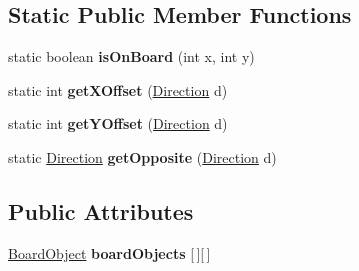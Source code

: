 \subsection*{Static Public Member Functions}
\begin{DoxyCompactItemize}
\item 
\mbox{\label{classasciicrawler_1_1Board_abf113bdc50898a0f64eb3611b98111ea}} 
static boolean {\bfseries is\+On\+Board} (int x, int y)
\item 
\mbox{\label{classasciicrawler_1_1Board_a3ec369e192af66b0aa62f0a5ed5f18b0}} 
static int {\bfseries get\+X\+Offset} (\hyperlink{enumasciicrawler_1_1Direction}{Direction} d)
\item 
\mbox{\label{classasciicrawler_1_1Board_a8de1ca8752186e89183ec33c24316c41}} 
static int {\bfseries get\+Y\+Offset} (\hyperlink{enumasciicrawler_1_1Direction}{Direction} d)
\item 
\mbox{\label{classasciicrawler_1_1Board_a115e44d78ee7c3edbd83dba743433634}} 
static \hyperlink{enumasciicrawler_1_1Direction}{Direction} {\bfseries get\+Opposite} (\hyperlink{enumasciicrawler_1_1Direction}{Direction} d)
\end{DoxyCompactItemize}
\subsection*{Public Attributes}
\begin{DoxyCompactItemize}
\item 
\mbox{\label{classasciicrawler_1_1Board_a1417cc9364dcde96656344cd1fbba64b}} 
\hyperlink{classasciicrawler_1_1BoardObject}{Board\+Object} {\bfseries board\+Objects} \mbox{[}$\,$\mbox{]}\mbox{[}$\,$\mbox{]}
\end{DoxyCompactItemize}
